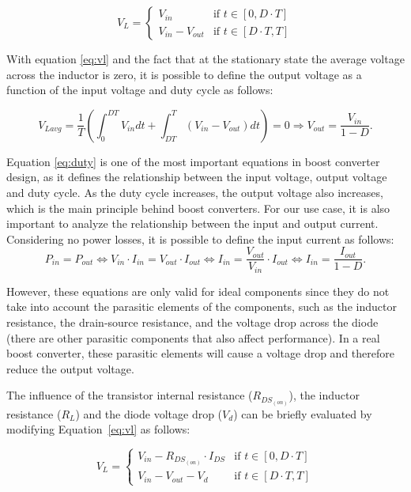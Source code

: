 \begin{equation}
    V_L = \begin{cases}
    V_{in} & \text{if } t \in [0, D \cdot T] \\
    V_{in} - V_{out} & \text{if } t \in [D \cdot T, T]
  \end{cases}
  \label{eq:vl}
\end{equation}

With equation \ref{eq:vl} and the fact that at the stationary state the average voltage across the inductor is zero, it is possible to define the output voltage as a function of the input voltage and duty cycle as follows:

\begin{equation}
    V_{Lavg} = \frac{1}{T} (\int_{0}^{DT} V_{in} dt + \int_{DT}^{T} (V_{in} - V_{out}) dt) = 0 \Rightarrow V_{out} = \frac{V_{in}}{1-D} .
    \label{eq:duty}
\end{equation}

Equation \ref{eq:duty} is one of the most important equations in boost converter design, as it defines the relationship between the input voltage, output voltage and duty cycle. As the duty cycle increases, the output voltage also increases, which is the main principle behind boost converters. For our use case, it is also important to analyze the relationship between the input and output current. Considering no power losses, it is possible to define the input current as follows:
\begin{equation}
    P_{in} = P_{out} \Leftrightarrow V_{in} \cdot I_{in} = V_{out} \cdot I_{out} \Leftrightarrow I_{in} = \frac{V_{out}}{V_{in}} \cdot I_{out} \Leftrightarrow I_{in} = \frac{I_{out}}{1-D}.
\end{equation}

However, these equations are only valid for ideal components since they do not take into account the parasitic elements of the components, such as the inductor resistance, the drain-source resistance, and the voltage drop across the diode (there are other parasitic components that also affect performance). In a real boost converter, these parasitic elements will cause a voltage drop and therefore reduce the output voltage. 

The influence of the transistor internal resistance ($R_{DS_{(on)}}$), the inductor resistance ($R_L$) and the diode voltage drop ($V_d$) can be briefly evaluated by modifying Equation~\ref{eq:vl} as follows:

\begin{equation}
    V_L = \begin{cases}
    V_{in} - R_{DS_{(on)}} \cdot I_{DS} & \text{if } t \in [0, D \cdot T] \\
    V_{in} - V_{out} - V_d & \text{if } t \in [D \cdot T, T]
  \end{cases}
  \label{eq:vl2}
\end{equation}

